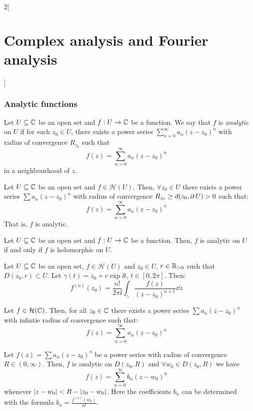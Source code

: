 \documentclass[../../../main.tex]{subfiles}
\begin{document}
\begin{multicols}{2}[\section{Complex analysis and Fourier analysis}]
  \subsubsection{Analytic functions}
  \begin{definition}
    Let $U\subseteq\mathbb{C}$ be an open set and $f:U\rightarrow \mathbb{C}$ be a function. We say that $f$ is \emph{analytic} on $U$ if for each $z_0\in U$, there exists a power series $\sum_{n=0}^\infty a_n{(z-z_0)}^n$ with radius of convergence $R_{z_0}$ such that $$f(z)=\sum_{n=0}^\infty a_n{(z-z_0)}^n$$ in a neighbourhood of $z$.
  \end{definition}
  \begin{theorem}
    Let $U\subseteq\mathbb{C}$ be an open set and $f\in\mathcal{H}(U)$. Then, $\forall z_0\in U$ there exists a power series $\sum a_n{(z-z_0)}^n$ with radius of convergence $R_{z_0}\geq d(z_0,\operatorname{\partial} U)>0$ such that: $$f(z)=\sum_{n=0}^\infty a_n{(z-z_0)}^n$$ That is, $f$ is analytic.
  \end{theorem}
  \begin{corollary}
    Let $U\subseteq\mathbb{C}$ be an open set and $f:U\rightarrow \mathbb{C}$ be a function. Then, $f$ is analytic on $U$ if and only if $f$ is holomorphic on $U$.
  \end{corollary}
  \begin{corollary}
    Let $U\subseteq\mathbb{C}$ be an open set, $f\in\mathcal{H}(U)$ and $z_0\in U$, $r\in\mathbb{R}_{>0}$ such that $\overline{D(z_0,r)}\subset U$. Let $\gamma(t)=z_0+r\exp{\ii t}$, $t\in[0,2\pi]$. Then:
    $$f^{(n)}(z_0)=\frac{n!}{2\pi\ii}\int_\gamma\frac{f(z)}{{(z-z_0)}^{n+1}}\dd{z}$$
  \end{corollary}
  \begin{corollary}
    Let $f\in\mathcal{H}(\mathbb{C})$. Then, for all $z_0\in\mathbb{C}$ there exists a power series $\sum a_n{(z-z_0)}^n$ with infintie radius of convergence such that: $$f(z)=\sum_{n=0}^\infty a_n{(z-z_0)}^n$$
  \end{corollary}
  \begin{corollary}
    Let $f(z)=\sum a_n{(z-z_0)}^n$ be a power series with radius of convergence $R\in(0,\infty)$. Then, $f$ is analytic on $D(z_0,R)$ and $\forall w_0\in D(z_0,R)$ we have $$f(z)=\sum_{n=0}^\infty b_n{(z-w_0)}^n$$ whenever $\abs{z-w_0}<R-|z_0-w_0|$. Here the coefficients $b_n$ can be determined with the formula $b_n=\frac{f^{(n)}(w_0)}{n!}$.
  \end{corollary}

\end{multicols}
\end{document}
